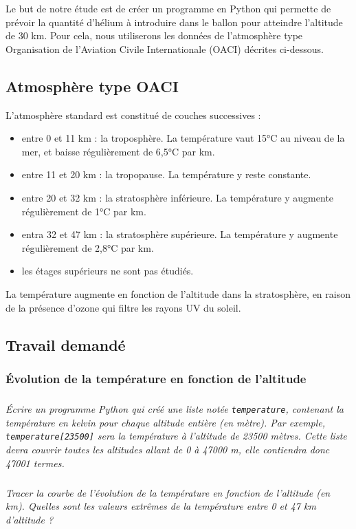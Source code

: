 \documentclass[10pt]{article}
\begin{document}
Le but de notre étude est de créer un programme en Python qui permette de prévoir la quantité d'hélium à introduire dans le ballon pour atteindre l'altitude de 30 km. Pour cela, nous utiliserons les données de l'atmosphère type Organisation de l'Aviation Civile Internationale (OACI) décrites ci-dessous.

\subsection{Atmosphère type OACI}

L'atmosphère standard est constitué de couches successives :
\begin{itemize}
\item entre 0 et 11 km : la troposphère. La température vaut 15°C au niveau de la mer, et baisse régulièrement de 6,5°C par km.
\item entre 11 et 20 km : la tropopause. La température y reste constante.
\item entre 20 et 32 km : la stratosphère inférieure. La température y augmente régulièrement de 1°C par km.
\item entra 32 et 47 km : la stratosphère supérieure. La température y augmente régulièrement de 2,8°C par km.
\item les étages supérieurs ne sont pas étudiés.
\end{itemize}

\begin{rem}
La température augmente en fonction de l'altitude dans la stratosphère, en raison de la présence d'ozone qui filtre les rayons UV du soleil.
\end{rem}

\subsection{Travail demandé}
\subsubsection*{\'Evolution de la température en fonction de l'altitude}
\subparagraph{}
\textit{Écrire un programme Python qui créé une liste notée \texttt{temperature}, contenant la température en kelvin pour chaque altitude entière (en mètre). Par exemple, \texttt{temperature[23500]} sera la température à l'altitude de 23500 mètres. Cette liste devra couvrir toutes les altitudes allant de 0 à 47000 m, elle contiendra donc 47001 termes.}

\subparagraph{}
\textit{Tracer la courbe de l'évolution de la température en fonction de l'altitude (en km). Quelles sont les valeurs extrêmes de la température entre 0 et 47 km d'altitude ?}
\end{document}
